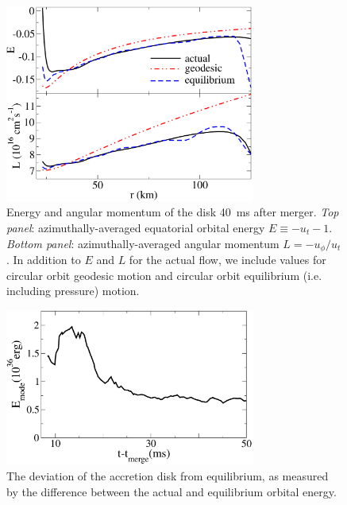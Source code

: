 \begin{figure}
\includegraphics[width=8.2cm]{Figures/EandL}
\caption[Radial profile of disk orbital energy and angular momentum]{
Energy and angular momentum of the disk 40~ms after merger.
{\em Top panel}: azimuthally-averaged equatorial orbital energy
$E\equiv-u_t-1$.
{\em Bottom panel}: azimuthally-averaged angular momentum
$L=-u_{\phi}/u_{t}$.
In addition to $E$ and $L$ for the
actual flow, we include values for circular orbit geodesic motion and
circular orbit equilibrium (i.e. including pressure) motion.
}
\label{fig:equilibrium}
\end{figure}

\begin{figure}
\includegraphics[width=8.2cm]{Figures/ModeEnergy}
\caption[Disk equilibrium over time]{The deviation of the accretion disk from
equilibrium, as measured by the difference between the
actual and equilibrium orbital energy.}
\label{fig:mode}
\end{figure}

